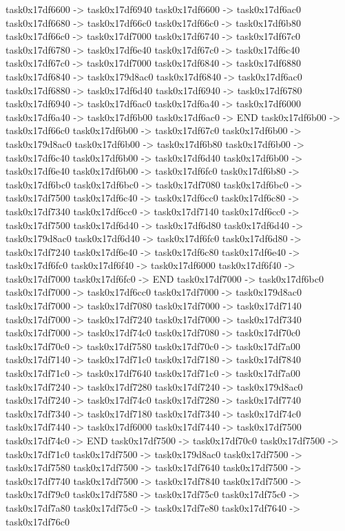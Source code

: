 {	task0x17df6600 -> task0x17df6940
	task0x17df6600 -> task0x17df6ac0
	task0x17df6680 -> task0x17df66c0
	task0x17df66c0 -> task0x17df6b80
	task0x17df66c0 -> task0x17df7000
	task0x17df6740 -> task0x17df67c0
	task0x17df6780 -> task0x17df6e40
	task0x17df67c0 -> task0x17df6c40
	task0x17df67c0 -> task0x17df7000
	task0x17df6840 -> task0x17df6880
	task0x17df6840 -> task0x179d8ac0
	task0x17df6840 -> task0x17df6ac0
	task0x17df6880 -> task0x17df6d40
	task0x17df6940 -> task0x17df6780
	task0x17df6940 -> task0x17df6ac0
	task0x17df6a40 -> task0x17df6000
	task0x17df6a40 -> task0x17df6b00
	task0x17df6ac0 -> END
	task0x17df6b00 -> task0x17df66c0
	task0x17df6b00 -> task0x17df67c0
	task0x17df6b00 -> task0x179d8ac0
	task0x17df6b00 -> task0x17df6b80
	task0x17df6b00 -> task0x17df6c40
	task0x17df6b00 -> task0x17df6d40
	task0x17df6b00 -> task0x17df6e40
	task0x17df6b00 -> task0x17df6fc0
	task0x17df6b80 -> task0x17df6bc0
	task0x17df6bc0 -> task0x17df7080
	task0x17df6bc0 -> task0x17df7500
	task0x17df6c40 -> task0x17df6cc0
	task0x17df6c80 -> task0x17df7340
	task0x17df6cc0 -> task0x17df7140
	task0x17df6cc0 -> task0x17df7500
	task0x17df6d40 -> task0x17df6d80
	task0x17df6d40 -> task0x179d8ac0
	task0x17df6d40 -> task0x17df6fc0
	task0x17df6d80 -> task0x17df7240
	task0x17df6e40 -> task0x17df6c80
	task0x17df6e40 -> task0x17df6fc0
	task0x17df6f40 -> task0x17df6000
	task0x17df6f40 -> task0x17df7000
	task0x17df6fc0 -> END
	task0x17df7000 -> task0x17df6bc0
	task0x17df7000 -> task0x17df6cc0
	task0x17df7000 -> task0x179d8ac0
	task0x17df7000 -> task0x17df7080
	task0x17df7000 -> task0x17df7140
	task0x17df7000 -> task0x17df7240
	task0x17df7000 -> task0x17df7340
	task0x17df7000 -> task0x17df74c0
	task0x17df7080 -> task0x17df70c0
	task0x17df70c0 -> task0x17df7580
	task0x17df70c0 -> task0x17df7a00
	task0x17df7140 -> task0x17df71c0
	task0x17df7180 -> task0x17df7840
	task0x17df71c0 -> task0x17df7640
	task0x17df71c0 -> task0x17df7a00
	task0x17df7240 -> task0x17df7280
	task0x17df7240 -> task0x179d8ac0
	task0x17df7240 -> task0x17df74c0
	task0x17df7280 -> task0x17df7740
	task0x17df7340 -> task0x17df7180
	task0x17df7340 -> task0x17df74c0
	task0x17df7440 -> task0x17df6000
	task0x17df7440 -> task0x17df7500
	task0x17df74c0 -> END
	task0x17df7500 -> task0x17df70c0
	task0x17df7500 -> task0x17df71c0
	task0x17df7500 -> task0x179d8ac0
	task0x17df7500 -> task0x17df7580
	task0x17df7500 -> task0x17df7640
	task0x17df7500 -> task0x17df7740
	task0x17df7500 -> task0x17df7840
	task0x17df7500 -> task0x17df79c0
	task0x17df7580 -> task0x17df75c0
	task0x17df75c0 -> task0x17df7a80
	task0x17df75c0 -> task0x17df7e80
	task0x17df7640 -> task0x17df76c0
}
